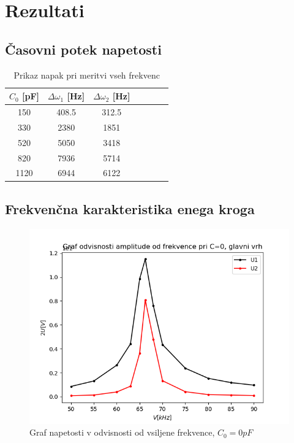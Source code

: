 \documentclass[11pt, a4paper]{article}
\theoremstyle{definition}
\theoremstyle{example}
\theoremstyle{izrek}
\begin{document}
\section{Rezultati}
\subsection{Časovni potek napetosti}
\begin{table}[ht]
	\centering
	\begin{tabular}{|c|c|c|c|c|c|c|}
		\hline
		$C_0$ [pF] & $\Delta \omega_1$ [Hz] & $\Delta \omega_2 $ [Hz] \\
		\hline
		\hline
		150 & 408.5 & 312.5  \\
		\hline
		330 & 2380 & 1851  \\
		\hline
		520 & 5050 & 3418\\
		\hline
		820 & 7936 & 5714 \\
		\hline
		1120 & 6944 & 6122\\
		\hline
		\end{tabular}
		\caption{Prikaz napak pri meritvi vseh frekvenc}
		\label{tab:FirstTable}
\end{table}

\subsection{Frekvenčna karakteristika enega kroga}

\begin{figure}[htp]
    \centering
    \includegraphics[width=12cm]{Karakteristika za C=0.png}
    \caption{Graf napetosti v odvisnosti od vsiljene frekvence, $C_0=0 pF$}
\end{figure}
\end{document}
